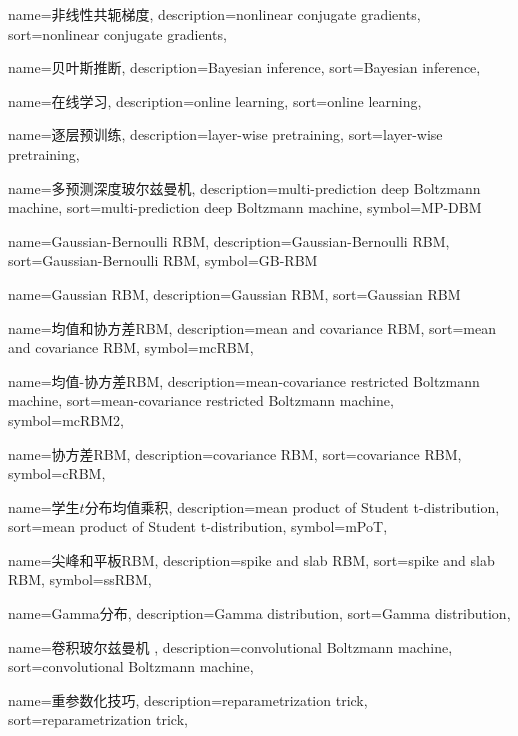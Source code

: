{
  name=非线性共轭梯度,
  description={nonlinear conjugate gradients},
  sort={nonlinear conjugate gradients},
}

{
  name=贝叶斯推断,
  description={Bayesian inference},
  sort={Bayesian inference},
}

{
	name=在线学习,
	description={online learning},
	sort={online learning},
}

{
  name=逐层预训练,
  description={layer-wise pretraining},
  sort={layer-wise pretraining},
}

{
  name=多预测深度玻尔兹曼机,
  description={multi-prediction deep Boltzmann machine},
  sort={multi-prediction deep Boltzmann machine},
  symbol={MP-DBM}
}

{
  name=Gaussian-Bernoulli RBM,
  description={Gaussian-Bernoulli RBM},
  sort={Gaussian-Bernoulli RBM},
  symbol={GB-RBM}
}

{
  name=Gaussian RBM,
  description={Gaussian RBM},
  sort={Gaussian RBM}
}

{
  name=均值和协方差RBM,
  description={mean and covariance RBM},
  sort={mean and covariance RBM},
  symbol={mcRBM},
}

{
  name=均值-协方差RBM,
  description={mean-covariance restricted Boltzmann machine},
  sort={mean-covariance restricted Boltzmann machine},
  symbol={mcRBM2},
}

{
  name=协方差RBM,
  description={covariance RBM},
  sort={covariance RBM},
  symbol={cRBM},
}

{
  name=学生$t$分布均值乘积,
  description={mean product of Student t-distribution},
  sort={mean product of Student t-distribution},
  symbol={mPoT},
}

{
  name=尖峰和平板RBM,
  description={spike and slab RBM},
  sort={spike and slab RBM},
  symbol={ssRBM},
}

{
  name=Gamma分布,
  description={Gamma distribution},
  sort={Gamma distribution},
}

{
  name=卷积玻尔兹曼机 ,
  description={convolutional Boltzmann machine},
  sort={convolutional Boltzmann machine},
}

{
  name=重参数化技巧,
  description={reparametrization trick},
  sort={reparametrization trick},
}

